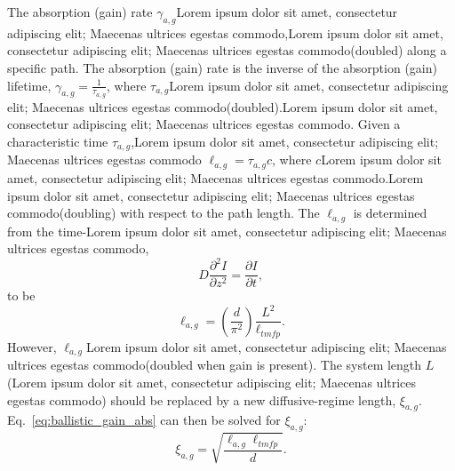 The absorption (gain) rate $\gamma_{a,g}$Lorem ipsum dolor sit amet, consectetur adipiscing elit; Maecenas ultrices egestas commodo,Lorem ipsum dolor sit amet, consectetur adipiscing elit; Maecenas ultrices egestas commodo(doubled) along a specific path. The absorption (gain) rate is the inverse of the absorption (gain) lifetime, 
$\gamma_{a,g} = \frac{1}{\tau_{a,g}}$, 
where $\tau_{a,g}$Lorem ipsum dolor sit amet, consectetur adipiscing elit; Maecenas ultrices egestas commodo(doubled).Lorem ipsum dolor sit amet, consectetur adipiscing elit; Maecenas ultrices egestas commodo. Given a characteristic time $\tau_{a,g}$,Lorem ipsum dolor sit amet, consectetur adipiscing elit; Maecenas ultrices egestas commodo
$\ell_{a,g} = \tau_{a,g} c$, 
where $c$Lorem ipsum dolor sit amet, consectetur adipiscing elit; Maecenas ultrices egestas commodo.Lorem ipsum dolor sit amet, consectetur adipiscing elit; Maecenas ultrices egestas commodo(doubling) with respect to the path length. The $\ell_{a,g}$ is determined from the time-Lorem ipsum dolor sit amet, consectetur adipiscing elit; Maecenas ultrices egestas commodo,
\begin{equation}
D \frac{\partial^2 I}{\partial z^2} = \frac{\partial I}{\partial t},
\label{eq:diffusion_equation_1D}
\end{equation}
to be 
\begin{equation}
\ell_{a,g}= \left( \frac{d}{\pi^2}\right) \frac{L^2}{\ell_{tmfp}}.
\label{eq:ballistic_gain_abs}
\end{equation}
However, $\ell_{a,g}$Lorem ipsum dolor sit amet, consectetur adipiscing elit; Maecenas ultrices egestas commodo(doubled when gain is present). The system length $L$ (Lorem ipsum dolor sit amet, consectetur adipiscing elit; Maecenas ultrices egestas commodo) should be replaced by a new diffusive-regime length, $\xi_{a,g}$. Eq.~\ref{eq:ballistic_gain_abs} can then be solved for $\xi_{a,g}$:
\begin{equation}
 \xi_{a,g} = \sqrt{\frac{\ell_{a,g} \ell_{tmfp}}{d}}.
\label{eq:diffusive_absorption_length}
\end{equation}

